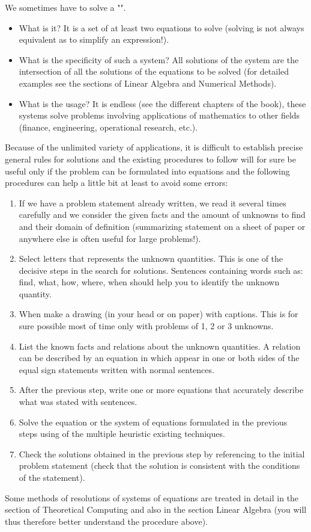	We sometimes have to solve a "".
	\begin{itemize}
		\item What is it? It is a set of at least two equations to solve (solving is not always equivalent as to simplify an expression!).

		\item What is the specificity of such a system? All solutions of the system are the intersection of all the solutions of the equations to be solved (for detailed examples see the sections of Linear Algebra and Numerical Methods). 

		\item What is the usage? It is endless (see the different chapters of the book), these systems solve problems involving applications of mathematics to other fields (finance, engineering, operational research, etc.).
	\end{itemize}		
	Because of the unlimited variety of applications, it is difficult to establish precise general rules for solutions and the existing procedures to follow will for sure be useful only if the problem can be formulated into equations and the following procedures can help a little bit at least to avoid some errors:
	\begin{enumerate}
		\item If we have a problem statement already written, we read it several times carefully and we consider the given facts and the amount of unknowns to find and their domain of definition (summarizing statement on a sheet of paper or anywhere else is often useful for large problems!).
		\item Select letters that represents the unknown quantities. This is one of the decisive steps in the search for solutions. Sentences containing words such as: find, what, how, where, when should help you to identify the unknown quantity.
		\item When make a drawing (in your head or on paper) with captions. This is for sure possible most of time only with problems of 1, 2 or 3 unknowns.
		\item List the known facts and relations about the unknown quantities. A relation can be described by an equation in which appear in one or both sides of the equal sign statements written with normal sentences.
		\item After the previous step, write one or more equations that accurately describe what was stated with sentences.
		
		\item Solve the equation or the system of equations formulated in the previous steps using of the multiple heuristic existing techniques.
		\item Check the solutions obtained in the previous step by referencing to the initial problem statement (check that the solution is consistent with the conditions of the statement).
	\end{enumerate}
	Some methods of resolutions of systems of equations are treated in detail in the section of Theoretical Computing and also in the section Linear Algebra (you will thus therefore better understand the procedure above).
	 
